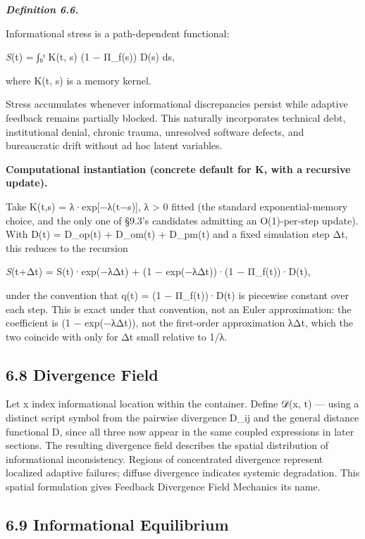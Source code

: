 \documentclass[
]{article}
\begin{document}
\emph{\textbf{Definition 6.6.}}

Informational stress is a path-dependent functional:

\emph{S}(t) = ∫₀ᵗ K(t, s) (1 − Π\_f(s)) D(s) ds,

where K(t, s) is a memory kernel.

Stress accumulates whenever informational discrepancies persist while
adaptive feedback remains partially blocked. This naturally incorporates
technical debt, institutional denial, chronic trauma, unresolved
software defects, and bureaucratic drift without ad hoc latent
variables.

\textbf{Computational instantiation (concrete default for K, with a
recursive update).}

Take K(t,s) = λ·exp{[}−λ(t−s){]}, λ \textgreater{} 0 fitted (the
standard exponential-memory choice, and the only one of §9.3's
candidates admitting an O(1)-per-step update). With D(t) = D\_op(t) +
D\_om(t) + D\_pm(t) and a fixed simulation step Δt, this reduces to the
recursion

\emph{S}(t+Δt) = S(t)·exp(−λΔt) + (1 − exp(−λΔt))·(1 − Π\_f(t))·D(t),

under the convention that q(t) = (1 − Π\_f(t))·D(t) is piecewise
constant over each step. This is exact under that convention, not an
Euler approximation: the coefficient is (1 − exp(−λΔt)), not the
first-order approximation λΔt, which the two coincide with only for Δt
small relative to 1/λ.

\hypertarget{divergence-field}{%
\subsection{6.8 Divergence Field}\label{divergence-field}}

Let x index informational location within the container. Define 𝒟(x, t)
--- using a distinct script symbol from the pairwise divergence D\_ij
and the general distance functional D, since all three now appear in the
same coupled expressions in later sections. The resulting divergence
field describes the spatial distribution of informational inconsistency.
Regions of concentrated divergence represent localized adaptive
failures; diffuse divergence indicates systemic degradation. This
spatial formulation gives Feedback Divergence Field Mechanics its name.

\hypertarget{informational-equilibrium}{%
\subsection{6.9 Informational
Equilibrium}\label{informational-equilibrium}}
\end{document}
